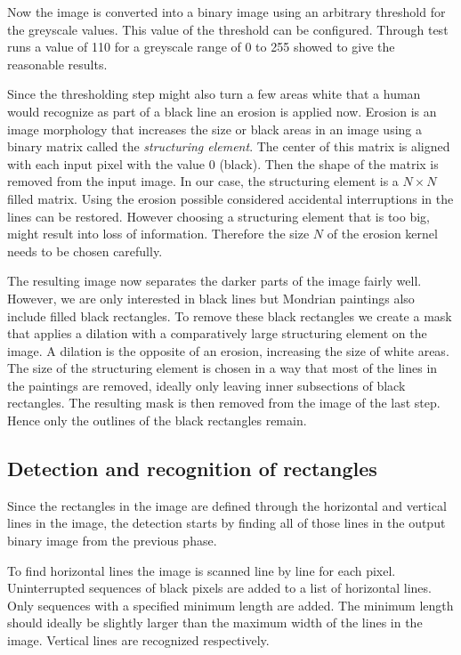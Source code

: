 Now the image is converted into a binary image using an arbitrary threshold for
the greyscale values. This value of the threshold can be configured. Through
test runs a value of 110 for a greyscale range of 0 to 255 showed to give the
reasonable results.

Since the thresholding step might also turn a few areas white that a human would
recognize as part of a black line an erosion is applied now. Erosion is an image
morphology that increases the size or black areas in an image using a binary
matrix called the \textit{structuring element}. The center of this matrix is
aligned with each input pixel with the value 0 (black). Then the shape of the
matrix is removed from the input image. In our case, the structuring element is
a $N\times N$ filled matrix. Using the erosion possible considered accidental
interruptions in the lines can be restored. However choosing a structuring
element that is too big, might result into loss of information. Therefore the
size $N$ of the erosion kernel needs to be chosen carefully.

The resulting image now separates the darker parts of the image fairly well.
However, we are only interested in black lines but Mondrian paintings also
include filled black rectangles. To remove these black rectangles we create a
mask that applies a dilation with a comparatively large structuring element on
the image. A dilation is the opposite of an erosion, increasing the size of
white areas. The size of the structuring element is chosen in a way that most of
the lines in the paintings are removed, ideally only leaving inner subsections
of black rectangles. The resulting mask is then removed from the image of the
last step. Hence only the outlines of the black rectangles remain.

\subsection{Detection and recognition of rectangles}

Since the rectangles in the image are defined through the horizontal and
vertical lines in the image, the detection starts by finding all of those lines
in the output binary image from the previous phase.

To find horizontal lines the image is scanned line by line for each pixel.
Uninterrupted sequences of black pixels are added to a list of horizontal lines.
Only sequences with a specified minimum length are added. The minimum length
should ideally be slightly larger than the maximum width of the lines in the
image. Vertical lines are recognized respectively.

